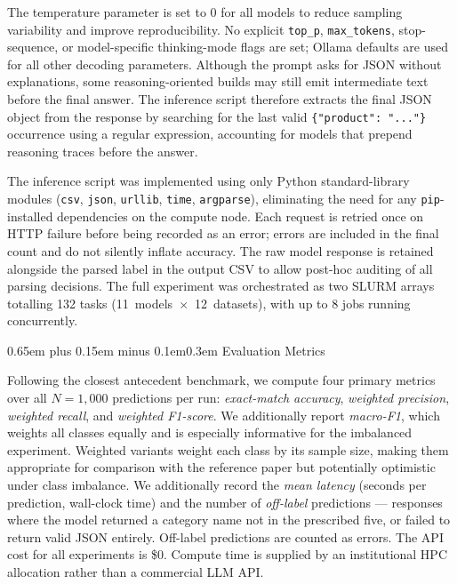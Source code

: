\documentclass[10pt,a4paper,twocolumn]{article}
\makeatletter
\renewcommand\subsection{\@startsection{subsection}{2}{0pt}%
  {0.65em plus 0.15em minus 0.1em}{0.3em}%
  {\normalfont\normalsize\itshape}}
\makeatother
\begin{document}
The temperature parameter is set to 0 for all models to reduce
sampling variability and improve reproducibility. No explicit
\texttt{top\_p}, \texttt{max\_tokens}, stop-sequence, or model-specific
thinking-mode flags are set; Ollama defaults are used for all other
decoding parameters. Although the prompt asks for JSON without
explanations, some reasoning-oriented builds may still emit
intermediate text before the final answer. The inference script
therefore extracts the final JSON object from the response by searching
for the last valid \texttt{\{"product": "..."\}} occurrence using a
regular expression, accounting for models that prepend reasoning traces
before the answer.

The inference script was implemented using only Python standard-library
modules (\texttt{csv}, \texttt{json}, \texttt{urllib}, \texttt{time},
\texttt{argparse}), eliminating the need for any \texttt{pip}-installed
dependencies on the compute node. Each request is retried once on
HTTP failure before being recorded as an error; errors are included in
the final count and do not silently inflate accuracy. The raw model
response is retained alongside the parsed label in the output CSV to
allow post-hoc auditing of all parsing decisions.
The full experiment was orchestrated as two SLURM arrays totalling
132 tasks (11~models~$\times$~12~datasets), with up to 8 jobs running
concurrently.

\subsection{Evaluation Metrics}

Following the closest antecedent benchmark, we compute four primary
metrics over all $N{=}1{,}000$ predictions per run:
\emph{exact-match accuracy}, \emph{weighted precision},
\emph{weighted recall}, and \emph{weighted F1-score}. We additionally
report \emph{macro-F1}, which weights all classes equally and is
especially informative for the imbalanced experiment. Weighted variants
weight each class by its sample size, making them appropriate for
comparison with the reference paper but potentially optimistic under
class imbalance. We additionally record the \emph{mean latency}
(seconds per prediction, wall-clock time) and the number of
\emph{off-label} predictions --- responses where the model returned a
category name not in the prescribed five, or failed to return valid
JSON entirely. Off-label predictions are counted as errors.
The API cost for all experiments is \$0. Compute time is supplied by
an institutional HPC allocation rather than a commercial LLM API.
\end{document}
